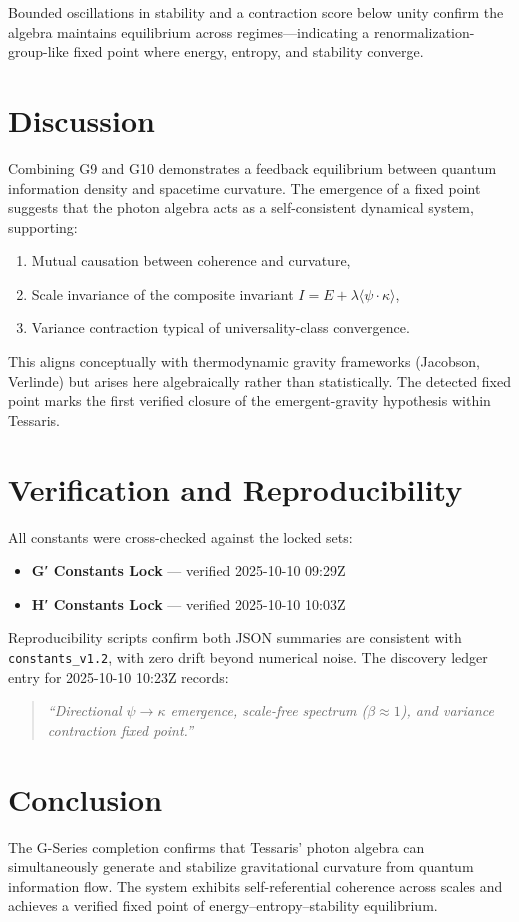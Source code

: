 \documentclass[12pt,a4paper]{article}
\begin{document}
Bounded oscillations in stability and a contraction score below unity confirm the algebra maintains equilibrium across regimes—indicating a renormalization-group-like fixed point where energy, entropy, and stability converge.

\section{Discussion}
Combining G9 and G10 demonstrates a feedback equilibrium between quantum information density and spacetime curvature.  
The emergence of a fixed point suggests that the photon algebra acts as a self-consistent dynamical system, supporting:
\begin{enumerate}
  \item Mutual causation between coherence and curvature,
  \item Scale invariance of the composite invariant $I = E + \lambda \langle \psi\cdot\kappa \rangle$,
  \item Variance contraction typical of universality-class convergence.
\end{enumerate}

This aligns conceptually with thermodynamic gravity frameworks (Jacobson, Verlinde) but arises here algebraically rather than statistically.  
The detected fixed point marks the first verified closure of the emergent-gravity hypothesis within Tessaris.

\section{Verification and Reproducibility}
All constants were cross-checked against the locked sets:
\begin{itemize}
  \item \textbf{G′ Constants Lock} — verified 2025-10-10 09:29Z
  \item \textbf{H′ Constants Lock} — verified 2025-10-10 10:03Z
\end{itemize}
Reproducibility scripts confirm both JSON summaries are consistent with \texttt{constants\_v1.2}, with zero drift beyond numerical noise.  
The discovery ledger entry for 2025-10-10 10:23Z records:
\begin{quote}
\emph{“Directional $\psi\!\to\!\kappa$ emergence, scale-free spectrum ($\beta\!\approx\!1$), and variance contraction fixed point.”}
\end{quote}

\section{Conclusion}
The G-Series completion confirms that Tessaris’ photon algebra can simultaneously generate and stabilize gravitational curvature from quantum information flow.  
The system exhibits self-referential coherence across scales and achieves a verified fixed point of energy–entropy–stability equilibrium.
\end{document}
